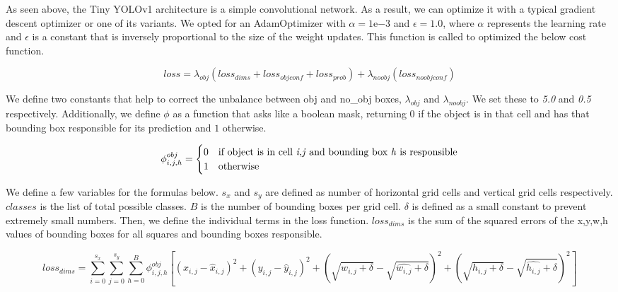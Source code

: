 \documentclass{article}
\begin{document}
As seen above, the Tiny YOLOv1 architecture is a simple convolutional network. As a result, we can optimize it with a typical gradient descent optimizer or one of its variants. We opted for an AdamOptimizer with $\alpha = 1\mathrm{e}{-3}$ and $\epsilon = 1.0$, where $\alpha$ represents the learning rate and $\epsilon$ is a constant that is inversely proportional to the size of the weight updates. This function is called to optimized the below cost function.

\begin{equation}
loss = \lambda_{obj}(loss_{dims} + loss_{objconf}  + loss_{prob}) + \lambda_{noobj}(loss_{noobjconf})
\end{equation} 

We define two constants that help to correct the unbalance between obj and no\_obj boxes, $\lambda_{obj}$ and $\lambda_{noobj}$. We set these to \textit{5.0} and \textit{0.5} respectively. Additionally, we define $\phi$ as a function that asks like a boolean mask, returning $0$ if the object is in that cell and has that bounding box responsible for its prediction and $1$ otherwise.

\begin{equation}
\phi_{i,j,h}^{obj} =
\begin{cases}
0 & \text{if object is in cell \textit{i,j} and bounding box \textit{h} is responsible} \\
1 & \text{otherwise}
\end{cases}
\end{equation}

We define a few variables for the formulas below. $s_x$ and $s_y$ are defined as number of horizontal grid cells and vertical grid cells respectively. $classes$ is the list of total possible classes. $B$ is the number of bounding boxes per grid cell. $\delta$ is defined as a small constant to prevent extremely small numbers. Then, we define the individual terms in the loss function. $loss_{dims}$ is the sum of the squared errors of the x,y,w,h values of bounding boxes for all squares and bounding boxes responsible. 

\begin{equation}
loss_{dims} = \sum\limits_{i=0}^{s_x}\sum\limits_{j=0}^{s_y}\sum\limits_{h=0}^{B}\phi_{i,j,h}^{obj}[(x_{i,j} - \hat{x}_{i,j})^2 + (y_{i,j} - \hat{y}_{i,j})^2 + (\sqrt{w_{i,j} + \delta} - \sqrt{\hat{w_{i,j}} + \delta})^2 + (\sqrt{h_{i,j} + \delta} - \sqrt{\hat{h_{i,j}} + \delta})^2]
\end{equation}
\end{document}
